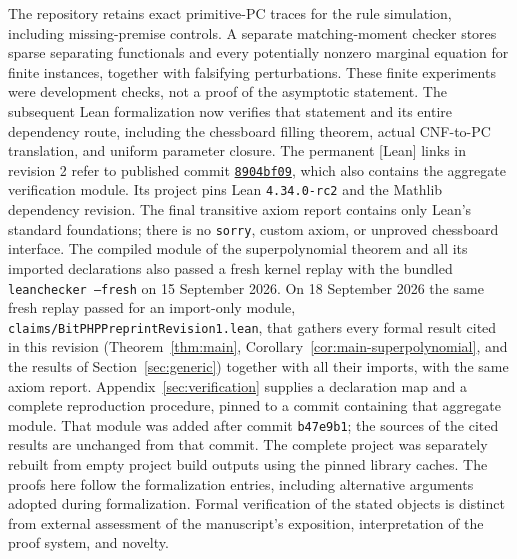 The repository retains exact primitive-PC traces for the rule
simulation, including missing-premise controls.
A separate matching-moment checker stores sparse separating
functionals and every potentially nonzero marginal equation for
finite instances, together with falsifying perturbations.
These finite experiments were development checks, not a proof of the asymptotic
statement. The subsequent Lean formalization now verifies that statement
and its entire dependency route, including the chessboard filling theorem,
actual CNF-to-PC translation, and uniform parameter closure. The permanent
[Lean] links in revision 2 refer to published commit
\href{https://github.com/kbr-/math-research/tree/8904bf09a5376f48a00d1c25d079bf0c6441502a}
{\texttt{8904bf09}}, which also contains the aggregate verification module.
Its project pins Lean \texttt{4.34.0-rc2} and the Mathlib dependency revision.
The final transitive axiom report contains only Lean's standard foundations;
there is no \texttt{sorry}, custom axiom, or unproved chessboard interface.
The compiled module of the superpolynomial theorem and all its imported
declarations also passed a fresh kernel replay with the bundled
\texttt{leanchecker --fresh} on 15 September 2026. On 18 September 2026 the
same fresh replay passed for an import-only module,
\texttt{claims/BitPHPPreprintRevision1.lean}, that gathers every formal
result cited in this revision (Theorem~\ref{thm:main},
Corollary~\ref{cor:main-superpolynomial}, and the results of
Section~\ref{sec:generic}) together with all their imports, with the same
axiom report. Appendix~\ref{sec:verification} supplies a declaration map
and a complete reproduction procedure, pinned to a commit containing that
aggregate module. That module was added after commit \texttt{b47e9b1}; the
sources of the cited results are unchanged from that commit. The complete project was separately rebuilt from empty
project build outputs using the pinned library caches.
The proofs here follow the formalization entries, including
alternative arguments adopted during formalization. Formal verification of
the stated objects is distinct from external assessment of the manuscript's
exposition, interpretation of the proof system, and novelty.

